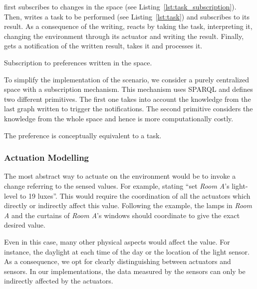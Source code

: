 \nodeProvSpace{} first subscribes to changes in the space (see Listing~\ref{lst:task_subscription}).
Then, \nodeConsSpace{} writes a task to be performed (see Listing~\ref{lst:task}) and subscribes to its result.
As a consequence of the writing, \nodeProvSpace{} reacts by taking the task, interpreting it, changing the environment through its actuator and writing the result.
Finally, \nodeConsSpace{} gets a notification of the written result, takes it and processes it.


\begin{listing}
  
  \caption{Subscription to preferences written in the space.}
  \label{lst:task_subscription}
\end{listing}


To simplify the implementation of the scenario, we consider a purely centralized space with a subscription mechanism.
This mechanism uses SPARQL  and defines two different primitives.
The first one takes into account the knowledge from the last graph written to trigger the notifications.
The second primitive considers the knowledge from the whole space and hence is more computationally costly.

\begin{listing}
  
  \caption{The preference is conceptually equivalent to a task.}
  \label{lst:task}
\end{listing}



\subsubsection{Actuation Modelling}

The most abstract way to actuate on the environment would be to invoke a change referring to the sensed values.
For example, stating ``set \emph{Room A}'s light-level to 19 luxes''.
This would require the coordination of all the actuators which directly or indirectly affect this value.
Following the example, the lamps in \emph{Room A} and the curtains of \emph{Room A}'s windows should coordinate to give the exact desired value.


Even in this case, many other physical aspects would affect the value.
For instance, the daylight at each time of the day or the location of the light sensor.
As a consequence, we opt for clearly distinguishing between actuators and sensors.
In our implementations, the data measured by the sensors can only be indirectly affected by the actuators.


